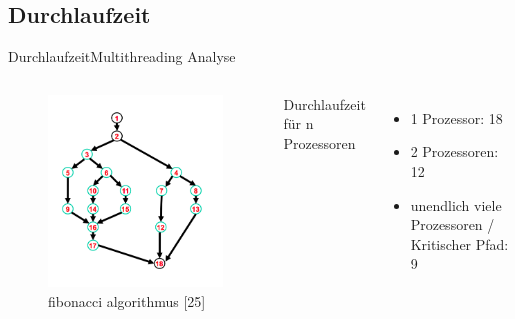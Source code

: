 \documentclass{beamer}
\begin{document}
\subsection{Durchlaufzeit}
\begin{frame}{Durchlaufzeit}{Multithreading Analyse}
\begin{columns}
        \begin{figure}
        \centering
        \includegraphics[width=1\columnwidth]{./assets/gag.png}
        \caption{fibonacci algorithmus \cite{Herlihy1}[25]}
        \label{fig:my_label}
        \end{figure}
        Durchlaufzeit f\"ur n Prozessoren
        \begin{itemize}
        \item 1 Prozessor: 18
        \item 2 Prozessoren: 12
        \item unendlich viele Prozessoren / Kritischer Pfad: 9
        \end{itemize}
        
    
\end{columns}


\end{frame}
\end{document}
